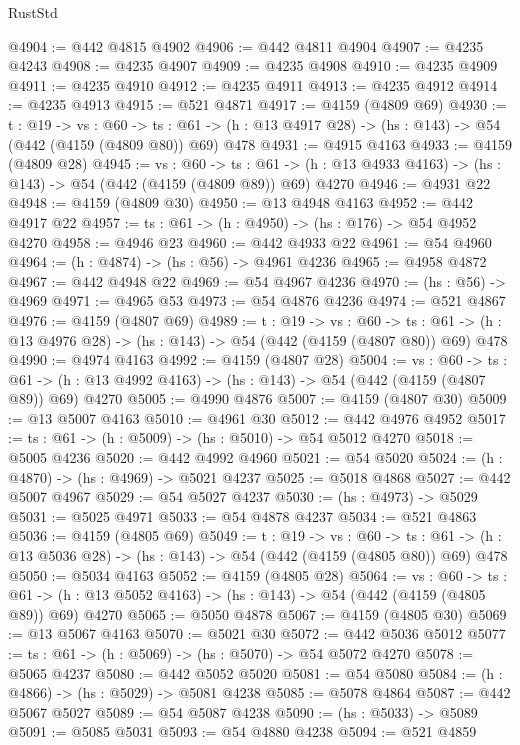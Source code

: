 \begin{lexlean}{RustStd}
\begin{coremodule}
@4904 := @442 @4815 @4902
@4906 := @442 @4811 @4904
@4907 := @4235 @4243
@4908 := @4235 @4907
@4909 := @4235 @4908
@4910 := @4235 @4909
@4911 := @4235 @4910
@4912 := @4235 @4911
@4913 := @4235 @4912
@4914 := @4235 @4913
@4915 := @521 @4871
@4917 := @4159 (@4809 @69)
@4930 := {t : @19} ->
  {vs : @60} ->
  {ts : @61} -> (h : @13 @4917 @28) -> (hs : @143) -> @54 (@442 (@4159 (@4809 @80)) @69) @478
@4931 := @4915 @4163
@4933 := @4159 (@4809 @28)
@4945 := {vs : @60} ->
  {ts : @61} -> (h : @13 @4933 @4163) -> (hs : @143) -> @54 (@442 (@4159 (@4809 @89)) @69) @4270
@4946 := @4931 @22
@4948 := @4159 (@4809 @30)
@4950 := @13 @4948 @4163
@4952 := @442 @4917 @22
@4957 := {ts : @61} -> (h : @4950) -> (hs : @176) -> @54 @4952 @4270
@4958 := @4946 @23
@4960 := @442 @4933 @22
@4961 := @54 @4960
@4964 := (h : @4874) -> (hs : @56) -> @4961 @4236
@4965 := @4958 @4872
@4967 := @442 @4948 @22
@4969 := @54 @4967 @4236
@4970 := (hs : @56) -> @4969
@4971 := @4965 @53
@4973 := @54 @4876 @4236
@4974 := @521 @4867
@4976 := @4159 (@4807 @69)
@4989 := {t : @19} ->
  {vs : @60} ->
  {ts : @61} -> (h : @13 @4976 @28) -> (hs : @143) -> @54 (@442 (@4159 (@4807 @80)) @69) @478
@4990 := @4974 @4163
@4992 := @4159 (@4807 @28)
@5004 := {vs : @60} ->
  {ts : @61} -> (h : @13 @4992 @4163) -> (hs : @143) -> @54 (@442 (@4159 (@4807 @89)) @69) @4270
@5005 := @4990 @4876
@5007 := @4159 (@4807 @30)
@5009 := @13 @5007 @4163
@5010 := @4961 @30
@5012 := @442 @4976 @4952
@5017 := {ts : @61} -> (h : @5009) -> (hs : @5010) -> @54 @5012 @4270
@5018 := @5005 @4236
@5020 := @442 @4992 @4960
@5021 := @54 @5020
@5024 := (h : @4870) -> (hs : @4969) -> @5021 @4237
@5025 := @5018 @4868
@5027 := @442 @5007 @4967
@5029 := @54 @5027 @4237
@5030 := (hs : @4973) -> @5029
@5031 := @5025 @4971
@5033 := @54 @4878 @4237
@5034 := @521 @4863
@5036 := @4159 (@4805 @69)
@5049 := {t : @19} ->
  {vs : @60} ->
  {ts : @61} -> (h : @13 @5036 @28) -> (hs : @143) -> @54 (@442 (@4159 (@4805 @80)) @69) @478
@5050 := @5034 @4163
@5052 := @4159 (@4805 @28)
@5064 := {vs : @60} ->
  {ts : @61} -> (h : @13 @5052 @4163) -> (hs : @143) -> @54 (@442 (@4159 (@4805 @89)) @69) @4270
@5065 := @5050 @4878
@5067 := @4159 (@4805 @30)
@5069 := @13 @5067 @4163
@5070 := @5021 @30
@5072 := @442 @5036 @5012
@5077 := {ts : @61} -> (h : @5069) -> (hs : @5070) -> @54 @5072 @4270
@5078 := @5065 @4237
@5080 := @442 @5052 @5020
@5081 := @54 @5080
@5084 := (h : @4866) -> (hs : @5029) -> @5081 @4238
@5085 := @5078 @4864
@5087 := @442 @5067 @5027
@5089 := @54 @5087 @4238
@5090 := (hs : @5033) -> @5089
@5091 := @5085 @5031
@5093 := @54 @4880 @4238
@5094 := @521 @4859

\end{coremodule}
\end{lexlean}
